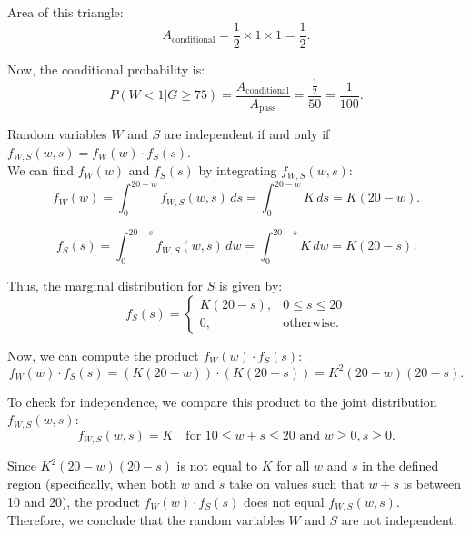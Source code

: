 \begin{solution}
   Area of this triangle:
   \[
   A_{\text{conditional}} = \frac{1}{2} \times 1 \times 1 = \frac{1}{2}.
   \]

   Now, the conditional probability is:
   \[
   P(W < 1 | G \geq 75) = \frac{A_{\text{conditional}}}{A_{\text{pass}}} = \frac{\frac{1}{2}}{50} = \frac{1}{100}.
   \]

   Random variables \( W \) and \( S \) are independent if and only if \( f_{W,S}(w,s) = f_W(w) \cdot f_S(s) \). \\

   We can find \( f_W(w) \) and \( f_S(s) \) by integrating \( f_{W,S}(w,s) \):
   \[
   f_W(w) = \int_0^{20 - w} f_{W,S}(w,s) \, ds = \int_0^{20 - w} K \, ds = K(20 - w).
   \]

   \[
    f_S(s) = \int_0^{20 - s} f_{W,S}(w,s) \, dw = \int_0^{20 - s} K \, dw = K(20 - s).
    \]
 
    Thus, the marginal distribution for \( S \) is given by:
    \[
    f_S(s) = 
    \begin{cases}
    K(20 - s), & 0 \leq s \leq 20 \\
    0, & \text{otherwise.}
    \end{cases}
    \]
 
    Now, we can compute the product \( f_W(w) \cdot f_S(s) \):
    \[
    f_W(w) \cdot f_S(s) = \left(K(20 - w)\right) \cdot \left(K(20 - s)\right) = K^2 (20 - w)(20 - s).
    \]
 
    To check for independence, we compare this product to the joint distribution \( f_{W,S}(w,s) \):
    \[
    f_{W,S}(w,s) = K \quad \text{for } 10 \leq w + s \leq 20 \text{ and } w \geq 0, s \geq 0.
    \]
 
    Since \( K^2 (20 - w)(20 - s) \) is not equal to \( K \) for all \( w \) and \( s \) in the defined region (specifically, when both \( w \) and \( s \) take on values such that \( w + s \) is between 10 and 20), the product \( f_W(w) \cdot f_S(s) \) does not equal \( f_{W,S}(w,s) \). \\
    
    Therefore, we conclude that the random variables \( W \) and \( S \) are not independent.
\end{solution}

